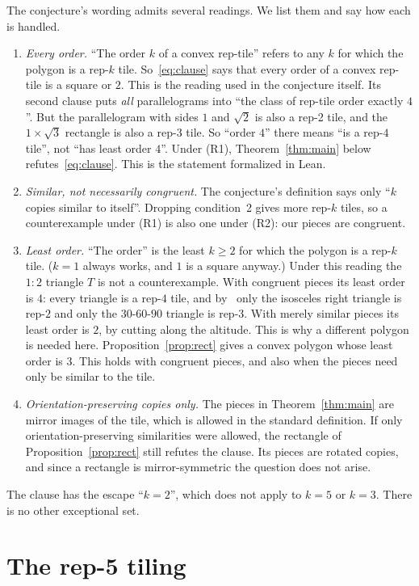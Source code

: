\documentclass[11pt]{article}
\theoremstyle{definition}
\theoremstyle{remark}
\begin{document}
The conjecture's wording admits several readings. We list them and say how each is handled.
\begin{enumerate}
\item[(R1)] \emph{Every order.} ``The order $k$ of a convex rep-tile'' refers to any $k$
for which the polygon is a rep-$k$ tile. So~\eqref{eq:clause} says that every order of a
convex rep-tile is a square or $2$. This is the reading used in the conjecture itself. Its
second clause puts \emph{all} parallelograms into ``the class of rep-tile order exactly
$4$''. But the parallelogram with sides $1$ and $\sqrt2$ is also a rep-2 tile, and the
$1\times\sqrt3$ rectangle is also a rep-3 tile. So ``order $4$'' there means ``is a
rep-$4$ tile'', not ``has least order $4$''. Under (R1), Theorem~\ref{thm:main} below
refutes~\eqref{eq:clause}. This is the statement formalized in Lean.
\item[(R2)] \emph{Similar, not necessarily congruent.} The conjecture's definition says
only ``$k$ copies similar to itself''. Dropping condition~2 gives more rep-$k$ tiles, so a
counterexample under (R1) is also one under (R2): our pieces are congruent.
\item[(R3)] \emph{Least order.} ``The order'' is the least $k\ge2$ for which the polygon
is a rep-$k$ tile. ($k=1$ always works, and $1$ is a square anyway.)
Under this reading the $1:2$ triangle $T$ is not a counterexample. With congruent pieces its
least order is $4$: every triangle is a rep-$4$ tile, and by~\cite{snover} only the isosceles
right triangle is rep-$2$ and only the $30$-$60$-$90$ triangle is rep-$3$. With merely
similar pieces its least order is $2$, by cutting along the altitude. This is why a different
polygon is needed here. Proposition~\ref{prop:rect} gives a convex polygon whose least order
is $3$. This holds with congruent pieces, and also when the pieces need only be similar to
the tile.
\item[(R4)] \emph{Orientation-preserving copies only.} The pieces in
Theorem~\ref{thm:main} are mirror images of the tile, which is allowed in the standard
definition. If only orientation-preserving similarities were allowed, the rectangle of
Proposition~\ref{prop:rect} still refutes the clause. Its pieces are rotated copies, and
since a rectangle is mirror-symmetric the question does not arise.
\end{enumerate}
The clause has the escape ``$k=2$'', which does not apply to $k=5$ or $k=3$. There is no
other exceptional set.

\section{\texorpdfstring{The rep-5 tiling}{The rep-5 tiling}}\label{sec:main}
\end{document}

